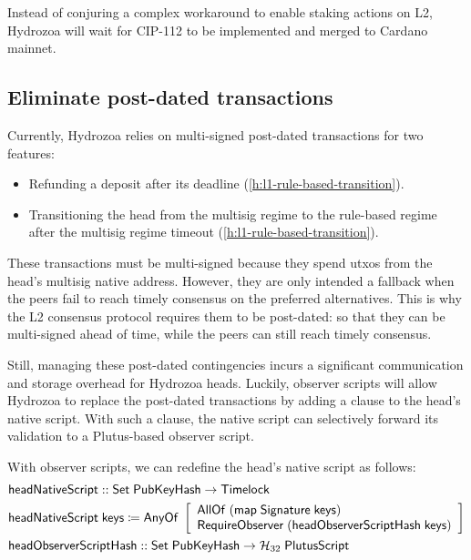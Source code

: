 \documentclass[../hydrozoa.tex]{subfiles}
\begin{document}
Instead of conjuring a complex workaround to enable staking actions on L2, Hydrozoa will wait for CIP-112 to be implemented and merged to Cardano mainnet.

\subsection{Eliminate post-dated transactions}%
\label{h:observer-script-eliminate-post-dated-txs}%

Currently, Hydrozoa relies on multi-signed post-dated transactions for two features:
\begin{itemize}
  \item Refunding a deposit after its deadline (\cref{h:l1-rule-based-transition}).
  \item Transitioning the head from the multisig regime to the rule-based regime after the multisig regime timeout (\cref{h:l1-rule-based-transition}).
\end{itemize}
These transactions must be multi-signed because they spend utxos from the head's multisig native address.
However, they are only intended a fallback when the peers fail to reach timely consensus on the preferred alternatives. This is why the L2 consensus protocol requires them to be post-dated: so that they can be multi-signed ahead of time, while the peers can still reach timely consensus.

Still, managing these post-dated contingencies incurs a significant communication and storage overhead for Hydrozoa heads.
Luckily, observer scripts will allow Hydrozoa to replace the post-dated transactions by adding a  clause to the head's native script.
With such a clause, the native script can selectively forward its validation to a Plutus-based observer script.

With observer scripts, we can redefine the head's native script as follows:
\begin{equation*}
\begin{split}
  &\mathsf{headNativeScript} :: \mathsf{Set} \; \mathsf{PubKeyHash} -> \mathsf{Timelock} \\
  &\mathsf{headNativeScript} \; \mathsf{keys} \coloneq
    \mathsf{AnyOf} \; \left[
    \begin{array}{l}
      \mathsf{AllOf} \; (\mathsf{map} \; \mathsf{Signature} \; \mathsf{keys}) \\
      \mathsf{RequireObserver} \; (\mathsf{headObserverScriptHash \; \mathsf{keys}})
    \end{array}\right] \\
  &\mathsf{headObserverScriptHash} ::
      \mathsf{Set} \; \mathsf{PubKeyHash} -> \mathcal{H}_{32} \; \mathsf{PlutusScript}
\end{split}
\end{equation*}
\end{document}
